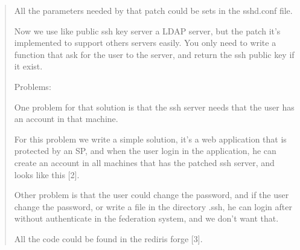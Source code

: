 \begin{quote}
    All the parameters needed by that patch could be sets in the
    sshd.conf file.

    Now we use like public ssh key server a LDAP server, but the patch
    it's implemented to support others servers easily. You only need
    to write a function that ask for the user to the server, and
    return the ssh public key if it exist.

Problems:
    
    One problem for that solution is that the ssh server needs that
    the user has an account in that machine.

    For this problem we write a simple solution, it's a web
    application that is protected by an SP, and when the user login in
    the application, he can create an account in all machines that
    has the patched ssh server, and looks like this [2].

    Other problem is that the user could change the password, and if
    the user change the password, or write a file in the directory
    .ssh, he can login after without authenticate in the federation
    system, and we don't want that.

All the code could be found in the rediris forge [3].


\end{quote}
